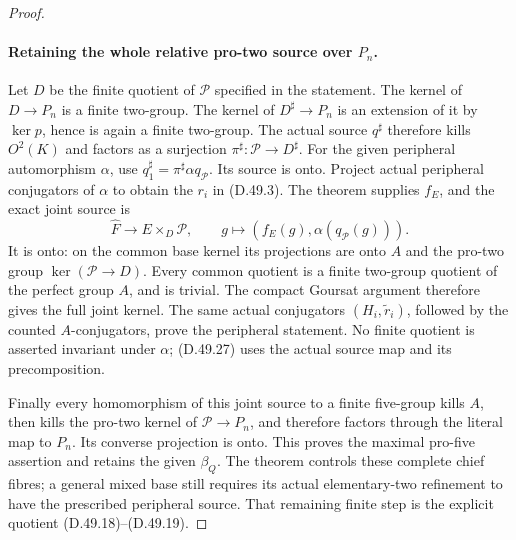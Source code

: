\begin{proof}
\paragraph{Retaining the whole relative pro-two source over \(P_n\).}
Let \(D\) be the finite quotient of \(\mathcal P\) specified in the
statement. The kernel of \(D\to P_n\) is a finite two-group.
The kernel of \(D^\sharp\to P_n\) is an extension of it by
\(\ker p\), hence is again a finite two-group.
The actual source \(q^\sharp\) therefore kills \(O^2(K)\) and
factors as a surjection \(\pi^\sharp:\mathcal P\to D^\sharp\).
For the given peripheral automorphism \(\alpha\), use
\(q_1^\sharp=\pi^\sharp\alpha q_{\mathcal P}\).
Its source is onto. Project actual peripheral conjugators of
\(\alpha\) to obtain the \(r_i\) in \textup{(D.49.3)}.
The theorem supplies \(f_E\), and the exact joint source is
\[
 \widehat F\longrightarrow E\times_D\mathcal P,
           \qquad g\longmapsto(f_E(g),\alpha(q_{\mathcal P}(g))).
 \tag{D.49.27}
\]
It is onto: on the common base kernel its projections are onto
\(A\) and the pro-two group \(\ker(\mathcal P\to D)\).
Every common quotient is a finite two-group quotient of the
perfect group \(A\), and is trivial. The compact Goursat argument
therefore gives the full joint kernel.
The same actual conjugators \((H_i,\widetilde r_i)\), followed by
the counted \(A\)-conjugators, prove the peripheral statement.
No finite quotient is asserted invariant under \(\alpha\);
\textup{(D.49.27)} uses the actual source map and its precomposition.

Finally every homomorphism of this joint source to a finite
five-group kills \(A\), then kills the pro-two kernel of
\(\mathcal P\to P_n\), and therefore factors through the literal
map to \(P_n\). Its converse projection is onto. This proves the
maximal pro-five assertion and retains the given \(\beta_Q\).
The theorem controls these complete chief fibres; a general mixed
base still requires its actual elementary-two refinement to have
the prescribed peripheral source. That remaining finite step is
the explicit quotient \textup{(D.49.18)--(D.49.19)}.
\end{proof}

